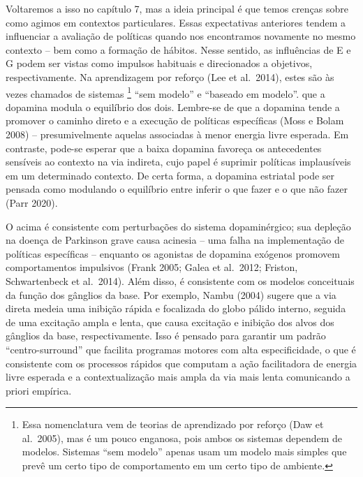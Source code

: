 \documentclass[
  12pt,
]{book}
\begin{document}
Voltaremos a isso no capítulo 7, mas a ideia principal é que temos crenças sobre como agimos em contextos particulares. Essas expectativas anteriores tendem a influenciar a avaliação de políticas quando nos encontramos novamente no mesmo contexto -- bem como a formação de hábitos. Nesse sentido, as influências de E e G podem ser vistas como impulsos habituais e direcionados a objetivos, respectivamente. Na aprendizagem por reforço (Lee et al.~2014), estes são às vezes chamados de sistemas \footnote{Essa nomenclatura vem de teorias de aprendizado por reforço (Daw et al.~2005), mas é um pouco enganosa, pois ambos os sistemas dependem de modelos. Sistemas ``sem modelo'' apenas usam um modelo mais simples que prevê um certo tipo de comportamento em um certo tipo de ambiente.} ``sem modelo'' e ``baseado em modelo''. que a dopamina modula o equilíbrio dos dois. Lembre-se de que a dopamina tende a promover o caminho direto e a execução de políticas específicas (Moss e Bolam 2008) -- presumivelmente aquelas associadas à menor energia livre esperada. Em contraste, pode-se esperar que a baixa dopamina favoreça os antecedentes sensíveis ao contexto na via indireta, cujo papel é suprimir políticas implausíveis em um determinado contexto. De certa forma, a dopamina estriatal pode ser pensada como modulando o equilíbrio entre inferir o que fazer e o que não fazer (Parr 2020).

O acima é consistente com perturbações do sistema dopaminérgico; sua depleção na doença de Parkinson grave causa acinesia -- uma falha na implementação de políticas específicas -- enquanto os agonistas de dopamina exógenos promovem comportamentos impulsivos (Frank 2005; Galea et al.~2012; Friston, Schwartenbeck et al.~2014). Além disso, é consistente com os modelos conceituais da função dos gânglios da base. Por exemplo, Nambu (2004) sugere que a via direta medeia uma inibição rápida e focalizada do globo pálido interno, seguida de uma excitação ampla e lenta, que causa excitação e inibição dos alvos dos gânglios da base, respectivamente. Isso é pensado para garantir um padrão ``centro-surround'' que facilita programas motores com alta especificidade, o que é consistente com os processos rápidos que computam a ação facilitadora de energia livre esperada e a contextualização mais ampla da via mais lenta comunicando a priori empírica.
\end{document}

